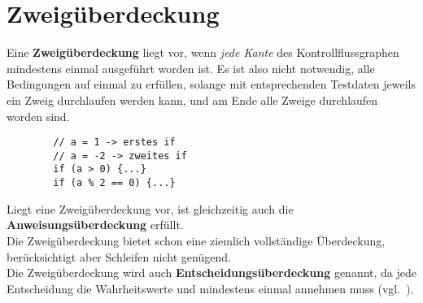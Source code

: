 \section{Zweigüberdeckung}


\begin{tcolorbox}[title=Zweigüberdeckung]
    Eine \textbf{Zweigüberdeckung} liegt vor, wenn \textit{jede Kante} des Kontrollflussgraphen mindestens einmal ausgeführt worden ist.
    Es ist also nicht notwendig, alle Bedingungen auf einmal zu erfüllen, solange mit entsprechenden Testdaten jeweils ein Zweig durchlaufen werden kann, und am Ende alle Zweige durchlaufen worden sind.
    \begin{verbatim}
        // a = 1 -> erstes if
        // a = -2 -> zweites if
        if (a > 0) {...}
        if (a % 2 == 0) {...}
    \end{verbatim}
    Liegt eine Zweigüberdeckung vor, ist gleichzeitig auch die \textbf{Anweisungsüberdeckung} erfüllt.\\
    Die Zweigüberdeckung bietet schon eine ziemlich vollständige Überdeckung, berücksichtigt aber Schleifen nicht genügend.\\

    \noindent
    Die Zweigüberdeckung wird auch \textbf{Entscheidungsüberdeckung} genannt, da jede Entscheidung die Wahrheitswerte  und  mindestens einmal annehmen muss (vgl.~\cite[404]{Bal97}).
\end{tcolorbox}